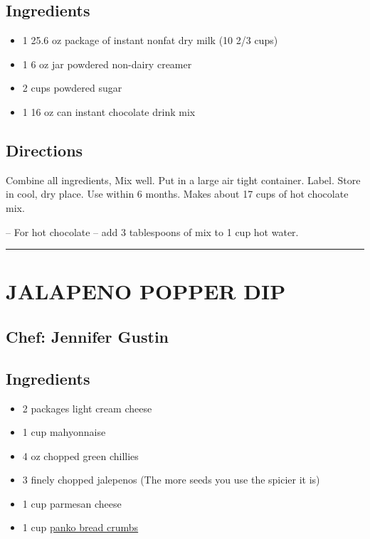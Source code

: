 \documentclass[
]{book}
\providecommand{\tightlist}{%
  \setlength{\itemsep}{0pt}\setlength{\parskip}{0pt}}
\begin{document}
\hypertarget{ingredients-7}{%
\subsection*{Ingredients}\label{ingredients-7}}


\begin{itemize}
\tightlist
\item
  1 25.6 oz package of instant nonfat dry milk (10 2/3 cups)
\item
  1 6 oz jar powdered non-dairy creamer
\item
  2 cups powdered sugar
\item
  1 16 oz can instant chocolate drink mix
\end{itemize}

\hypertarget{directions-7}{%
\subsection*{Directions}\label{directions-7}}


Combine all ingredients, Mix well. Put in a large air tight container.
Label. Store in cool, dry place. Use within 6 months. Makes about 17 cups of hot chocolate mix.

-- For hot chocolate -- add 3 tablespoons of mix to 1 cup hot water.

\begin{center}\rule{0.5\linewidth}{0.5pt}\end{center}

\hypertarget{jalapeno-popper-dip}{%
\section*{JALAPENO POPPER DIP}\label{jalapeno-popper-dip}}


\hypertarget{chef-jennifer-gustin-2}{%
\subsection*{Chef: Jennifer Gustin}\label{chef-jennifer-gustin-2}}


\hypertarget{ingredients-8}{%
\subsection*{Ingredients}\label{ingredients-8}}


\begin{itemize}
\tightlist
\item
  2 packages light cream cheese
\item
  1 cup mahyonnaise
\item
  4 oz chopped green chillies
\item
  3 finely chopped jalepenos (The more seeds you use the spicier it is)
\item
  1 cup parmesan cheese
\item
  1 cup \href{https://en.wikipedia.org/wiki/Bread_crumbs\#Panko}{panko bread crumbs}
\end{itemize}
\end{document}
